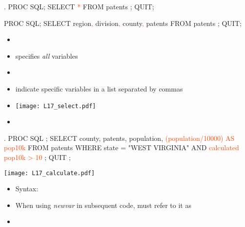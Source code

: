 \begin{frame}[fragile]
\begin{code}{.}
PROC SQL;
   SELECT \textcolor{OrangeRed}{*}
   FROM patents
   ;
QUIT;


PROC SQL;
   SELECT region\textcolor{OrangeRed}{,}
          division\textcolor{OrangeRed}{,}
          county\textcolor{OrangeRed}{,}
          patents
   FROM patents
   ;
QUIT;
\end{code}
\emp
{}
\begin{itemize}
\item[]
\item \ttt{*} specifies \emph{all} variables
\item[]
\item indicate specific variables in a list separated by commas
\item[] \texttt{[image: L17\_select.pdf]}
\item[]
\end{itemize}
\emp
\end{frame}

\begin{frame}[fragile]
\hspace*{-0.3in}
\begin{code}{.}
PROC SQL ;
   SELECT  county, patents, population,
           \textcolor{OrangeRed}{(population/10000) AS pop10k}
   FROM patents
   WHERE state = "WEST VIRGINIA"
         AND \textcolor{OrangeRed}{calculated pop10k > 10}
	;
QUIT ;
\end{code}
\emp
\blankcolumn
{}
\texttt{[image: L17\_calculate.pdf]}
\emp
\vskip5pt
\begin{itemize}
\item Syntax:  \vskip5pt
\item When using \emph{newvar} in subsequent code, must refer to it as
\item[]
\end{itemize}
\end{frame}

